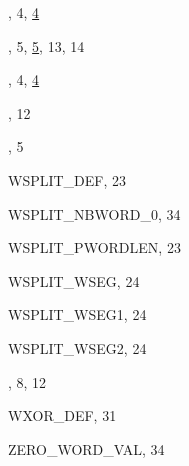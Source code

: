 \begin{theindex}
  \item {}, 4, \ul{4}
  \item {}, 5, \ul{5}, 13, 14
  \item {}, 4, \ul{4}
  \item {}, 12
  \item {}, 5
  \item {\ptt WSPLIT\_DEF}, 23
  \item {\ptt WSPLIT\_NBWORD\_0}, 34
  \item {\ptt WSPLIT\_PWORDLEN}, 23
  \item {\ptt WSPLIT\_WSEG}, 24
  \item {\ptt WSPLIT\_WSEG1}, 24
  \item {\ptt WSPLIT\_WSEG2}, 24
  \item {}, 8, 12
  \item {\ptt WXOR\_DEF}, 31

  \indexspace

  \item {\ptt ZERO\_WORD\_VAL}, 34

\end{theindex}
